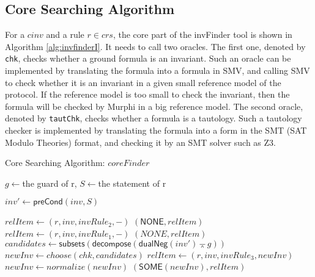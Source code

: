 \documentclass[conference]{IEEEtran}
\def \andc {\barwedge }
\begin{document}
\subsection{Core Searching Algorithm}\label{sec:coresearchingAlgorithm}

For a  $cinv$ and a rule $r \in crs$, the core part of the {\sf invFinder} tool is shown in Algorithm \ref{alg:invfinderI}. It needs to call two oracles. The first one, denoted by {\tt chk}, checks whether a ground formula is an invariant. Such an oracle can be implemented by translating the formula into a formula in SMV, and calling SMV to check whether it is an invariant  in a given small reference model of the protocol. If  the reference model is too small to check the invariant, then the formula will be checked by Murphi in a big reference model.  The second oracle, denoted by {\tt tautChk}, checks whether a formula is a tautology. Such a tautology checker is implemented by translating the formula into a form in the SMT (SAT Modulo Theories) format, and checking it by an SMT solver such as Z3.

\begin{algorithm}\label{alg:invFinder-I}

\caption{Core Searching Algorithm: $coreFinder$}\label{alg:invfinderI}



{
    $g\leftarrow $the guard of r, $S\leftarrow $the statement of r\;

    $inv'\leftarrow \mathsf{preCond}(inv, S)$\; \label{line:preCondComp}

    {
    $relItem\leftarrow (r, inv, invRule_2,-)$\;
    \Return $(\mathsf{NONE},  relItem )$\;
    }
    {
    $relItem\leftarrow (r, inv, invRule_1,-)$\;
    \Return $(NONE,  relItem )$\;
    }
    \Else
    {
    $candidates\leftarrow \mathsf{subsets}(\mathsf{decompose}(\mathsf{dualNeg}(inv')\andc g))$\;
    $newInv\leftarrow choose(chk,candidates)$\;
    $relItem\leftarrow (r, inv, invRule_3,newInv)$\;
    {
    $newInv \leftarrow  normalize(newInv)$\;%
    \Return $(\mathsf{SOME}(newInv),   relItem )$\;
    }
    }
}


\end{algorithm}
\end{document}

